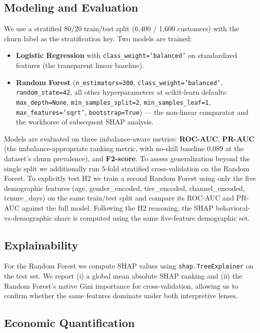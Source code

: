 \documentclass[conference]{IEEEtran}
\begin{document}
\subsection{Modeling and Evaluation}

We use a stratified 80/20 train/test split (6{,}400 / 1{,}600 customers) with the churn label as the stratification key. Two models are trained:

\begin{itemize}
\item \textbf{Logistic Regression} with \texttt{class\_weight='balanced'} on standardized features (the transparent linear baseline).
\item \textbf{Random Forest} (\texttt{n\_estimators=300}, \texttt{class\_weight='balanced'}, \texttt{random\_state=42}, all other hyperparameters at scikit-learn defaults: \texttt{max\_depth=None}, \texttt{min\_samples\_split=2}, \texttt{min\_samples\_leaf=1}, \texttt{max\_features='sqrt'}, \texttt{bootstrap=True}) — the non-linear comparator and the workhorse of subsequent SHAP analysis.
\end{itemize}

Models are evaluated on three imbalance-aware metrics: \textbf{ROC-AUC}, \textbf{PR-AUC} (the imbalance-appropriate ranking metric, with no-skill baseline 0.089 at the dataset's churn prevalence), and \textbf{F2-score}. To assess generalization beyond the single split we additionally run 5-fold stratified cross-validation on the Random Forest. To explicitly test H2 we train a second Random Forest using only the five demographic features (age, gender\_encoded, tier\_encoded, channel\_encoded, tenure\_days) on the same train/test split and compare its ROC-AUC and PR-AUC against the full model. Following the H2 reasoning, the SHAP behavioral-vs-demographic share is computed using the same five-feature demographic set.

\subsection{Explainability}

For the Random Forest we compute SHAP values using \texttt{shap.TreeExplainer} on the test set. We report (i) a global mean absolute SHAP ranking and (ii) the Random Forest's native Gini importance for cross-validation, allowing us to confirm whether the same features dominate under both interpretive lenses.

\subsection{Economic Quantification}
\end{document}
